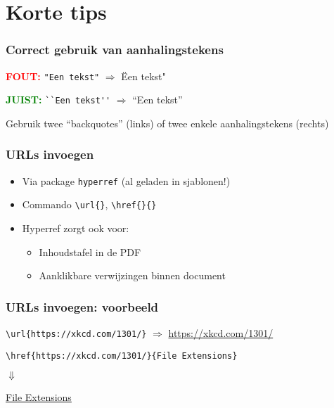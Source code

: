 \documentclass[aspectratio=169]{beamer}
\begin{document}
\section{Korte tips}

\begin{frame}[fragile]
  \frametitle{Correct gebruik van aanhalingstekens}

  \textcolor{red}{\textbf{FOUT:}} \verb|"Een tekst"| $\Rightarrow$ \"Een tekst"

  \bigskip

  \textcolor{green}{\textbf{JUIST:}} \verb|``Een tekst''| $\Rightarrow$ ``Een tekst''

  \bigskip

  Gebruik twee ``backquotes'' (links) of twee enkele aanhalingstekens (rechts)
\end{frame}

\begin{frame}[fragile]
  \frametitle{URLs invoegen}

  \begin{itemize}
    \item Via package \texttt{hyperref} (al geladen in sjablonen!)
    \item Commando \verb+\url{}+, \verb+\href{}{}+
    \item Hyperref zorgt ook voor:
      \begin{itemize}
        \item Inhoudstafel in de PDF
        \item Aanklikbare verwijzingen binnen document
      \end{itemize}
  \end{itemize}

\end{frame}

\begin{frame}[fragile]
  \frametitle{URLs invoegen: voorbeeld}

  \verb+\url{https://xkcd.com/1301/}+ $\Rightarrow$ \url{https://xkcd.com/1301/}

  \bigskip

  \verb+\href{https://xkcd.com/1301/}{File Extensions}+ 
  
  $\Downarrow$
  
  \href{https://xkcd.com/1301/}{File Extensions}

\end{frame}

\end{document}
